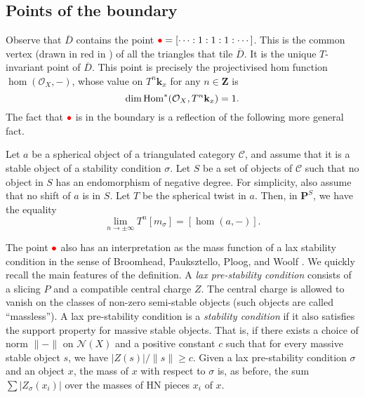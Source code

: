 \documentclass{amsart}
\begin{document}
\subsection{Points of the boundary}\label{sec:boundary}
Observe that \(\overline D\) contains the point \(\textcolor{red}{\bullet} = [\cdots :1:1:1: \cdots]\).
This is the common vertex (drawn in red in ) of all the triangles that tile \(\overline D\).
It is the unique \(T\)-invariant point of \(\overline D\).
This point is precisely the projectivised hom function \(\hom(\mathcal{O}_X,-)\), whose value on \(T^n \mathbf{k}_x\) for any \(n \in \mathbf{Z}\) is
\[ \dim \operatorname{Hom}^{*}(\mathcal{O}_{X}, T^n\mathbf{k}_x) = 1.\]
The fact that \(\textcolor{red}{\bullet}\) is in the boundary is a reflection of the following more general fact.
\begin{theorem}
  \label{thm:qhom}
  Let \(a\) be a spherical object of a triangulated category \(\mathcal{C}\), and assume that it is a stable object of a stability condition \(\sigma\).
  Let \(S\) be a set of objects of \(\mathcal{C}\) such that no object in \(S\) has an endomorphism of negative degree.
  For simplicity, also assume that no shift of \(a\) is in \(S\).
  Let \(T\) be the spherical twist in \(a\).
  Then, in \(\mathbf{P}^S\), we have the equality
  \[\lim_{n \to \pm \infty} T^n[m_{\sigma}] = [ \hom(a,-)].\]
\end{theorem}

The point \(\textcolor{red}{\bullet}\) also has an interpretation as the mass function of a lax stability condition in the sense of Broomhead, Pauksztello, Ploog, and Woolf \cite{bro.pau.plo.ea:22}.
We quickly recall the main features of the definition.
A \emph{lax pre-stability condition} consists of a slicing \(P\) and a compatible central charge \(Z\).
The central charge is allowed to vanish on the classes of non-zero semi-stable objects (such objects are called ``massless'').
A lax pre-stability condition is a \emph{stability condition} if it also satisfies the support property for massive stable objects.
That is, if there exists a choice of norm \(\|-\|\) on \(\mathcal{N}(X)\) and a positive constant \(c\) such that for every massive stable object \(s\), we have \(|Z(s)|/\|s\| \geq c\).
Given a lax pre-stability condition \(\sigma\) and an object \(x\), the mass of \(x\) with respect to \(\sigma\) is, as before, the sum \(\sum |Z_{\sigma}(x_i)|\) over the masses of HN pieces \(x_i\) of \(x\).
\end{document}
